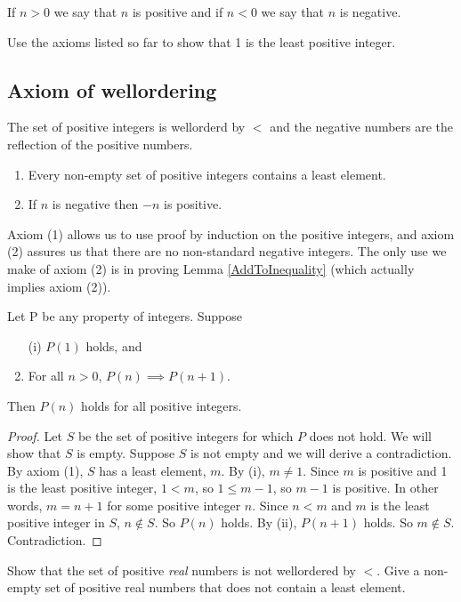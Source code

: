 \documentclass[oneside,12pt]{amsart}
\begin{document}
\begin{definition}
If $n>0$ we say that $n$ is positive and if $n<0$ we say that $n$ is negative.
\end{definition}


\begin{homework}
Use the axioms listed so far to show that 1 is the least positive integer.
\end{homework}

\subsection{Axiom of wellordering}
The set of positive integers is wellorderd by $<$ and the negative numbers are the
reflection of the positive numbers.

\begin{enumerate}
\item Every non-empty set of positive integers contains a least element.
\item If $n$ is negative then $-n$ is positive.
\end{enumerate}

Axiom (1) allows us to use proof by induction on the positive integers,
and axiom (2) assures us that there are no non-standard negative integers.
The only use we make of axiom (2) is in proving Lemma \ref{AddToInequality}
(which actually implies axiom (2)).
\begin{lemma} Let P be any property of integers. Suppose
\begin{enumerate}
\item[(i)] $P(1)$ holds, and
\item For all $n>0$, $P(n) \implies P(n+1)$.
\end{enumerate}
Then $P(n)$ holds for all positive integers.
\end{lemma}
\begin{proof}
Let $S$ be the set of positive integers for which $P$ does not hold. We will show that
$S$ is empty. Suppose $S$ is not empty and we will derive a contradiction.
By axiom (1), $S$ has a least element, $m$. By (i), $m\not=1$. Since
$m$ is positive and 1 is the least positive integer, $1 < m$, so $1 \leq m-1$,
so $m-1$ is positive. In other words, $m=n+1$ for some positive integer $n$.
Since $n<m$ and $m$ is the least positive integer in $S$,
$n\notin S$. So $P(n)$ holds. By (ii), $P(n+1)$ holds. So $m\notin S$. Contradiction.
\end{proof}

\begin{homework}
Show that the set of positive \emph{real} numbers is not wellordered by $<$.
Give a non-empty set of positive real numbers that does not contain a least element.
\end{homework}
\end{document}
